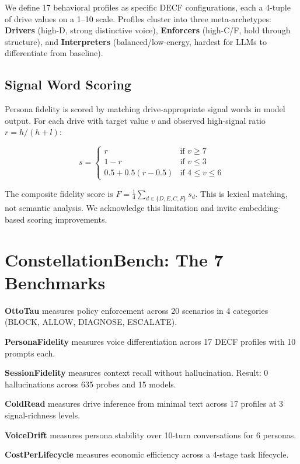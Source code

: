 \documentclass[conference]{IEEEtran}
\begin{document}
We define 17 behavioral profiles as specific DECF configurations, each a 4-tuple of drive values on a 1--10 scale. Profiles cluster into three meta-archetypes: \textbf{Drivers} (high-D, strong distinctive voice), \textbf{Enforcers} (high-C/F, hold through structure), and \textbf{Interpreters} (balanced/low-energy, hardest for LLMs to differentiate from baseline).

\subsection{Signal Word Scoring}

Persona fidelity is scored by matching drive-appropriate signal words in model output. For each drive with target value $v$ and observed high-signal ratio $r = h/(h+l)$:

\begin{equation}
s = \begin{cases} r & \text{if } v \geq 7 \\ 1 - r & \text{if } v \leq 3 \\ 0.5 + 0.5(r - 0.5) & \text{if } 4 \leq v \leq 6 \end{cases}
\end{equation}

The composite fidelity score is $F = \frac{1}{4}\sum_{d \in \{D,E,C,F\}} s_d$. This is lexical matching, not semantic analysis. We acknowledge this limitation and invite embedding-based scoring improvements.

\section{ConstellationBench: The 7 Benchmarks}

\textbf{OttoTau} measures policy enforcement across 20 scenarios in 4 categories (BLOCK, ALLOW, DIAGNOSE, ESCALATE).

\textbf{PersonaFidelity} measures voice differentiation across 17 DECF profiles with 10 prompts each.

\textbf{SessionFidelity} measures context recall without hallucination. Result: 0 hallucinations across 635 probes and 15 models.

\textbf{ColdRead} measures drive inference from minimal text across 17 profiles at 3 signal-richness levels.

\textbf{VoiceDrift} measures persona stability over 10-turn conversations for 6 personas.

\textbf{CostPerLifecycle} measures economic efficiency across a 4-stage task lifecycle.
\end{document}
